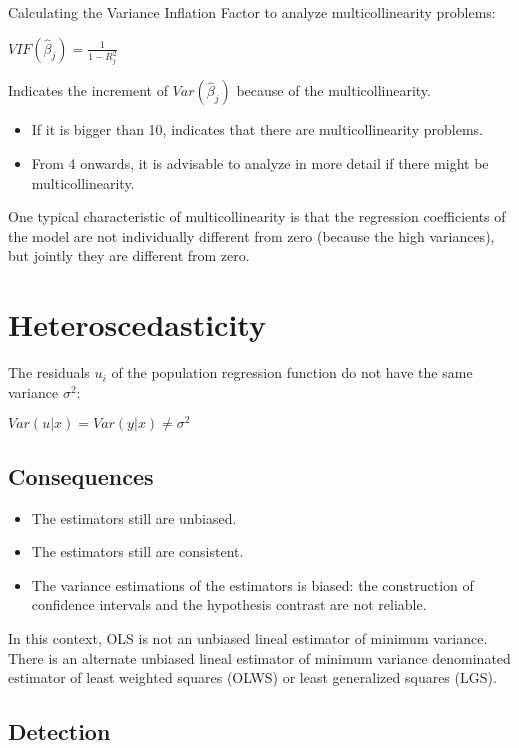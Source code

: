 \documentclass[10pt,landscape]{article}
\begin{document}
\begin{multicols}{3}
Calculating the Variance Inflation Factor to analyze multicollinearity problems:

$VIF(\hat{\beta}_j) = \frac{1}{1-R_j^2}$

Indicates the increment of $Var(\hat{\beta}_j)$ because of the multicollinearity.

\begin{itemize}[leftmargin=*]
\item If it is bigger than 10, indicates that there are multicollinearity problems.
\item From 4 onwards, it is advisable to analyze in more detail if there might be
multicollinearity.
\end{itemize}

One typical characteristic of multicollinearity is that the regression coefficients of the model are not individually different from zero (because the high variances), but jointly they are different from zero.

\section*{Heteroscedasticity}

The residuals $u_i$ of the population regression function do not have the same variance $\sigma^2$:

$Var(u|x) = Var(y|x) \neq \sigma^2$

\subsection*{Consequences}

\begin{itemize}[leftmargin=*]
\item The estimators still are unbiased.
\item The estimators still are consistent.
\item The variance estimations of the estimators is biased: the construction of confidence intervals and the hypothesis contrast are not reliable.
\end{itemize}

In this context, OLS is not an unbiased lineal estimator of minimum variance. There is an alternate unbiased lineal estimator of minimum variance denominated estimator of least weighted squares (OLWS) or least generalized squares (LGS).

\subsection*{Detection}


\end{multicols}
\end{document}
